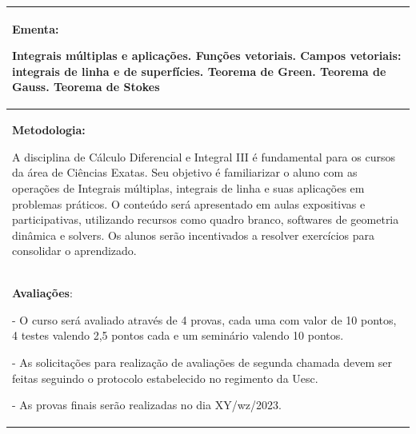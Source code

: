 \documentclass[12pt,a4paper]{article}
\begin{document}
\vspace{1.7cm}\hspace{-1.65cm}
\begin{tabular}{|p{16.8cm}|}
  \hline
  {\bf Ementa:}

  Integrais múltiplas e aplicações. Funções vetoriais. Campos vetoriais: integrais de linha e de superfícies. Teorema de Green. Teorema de Gauss. Teorema de Stokes\\ \hline
  {\bf Metodologia:}

  A disciplina de Cálculo Diferencial e Integral III é fundamental para os cursos da área de Ciências Exatas. Seu objetivo é familiarizar o aluno com as operações de Integrais múltiplas, integrais de linha e suas aplicações em problemas práticos. O conteúdo será apresentado em aulas expositivas e participativas, utilizando recursos como quadro branco, softwares de geometria dinâmica e solvers. Os alunos serão incentivados a resolver exercícios para consolidar o aprendizado.\\ \hline
  {\bf Avaliações}:
  {

  - O curso será avaliado através de 4 provas, cada uma com valor de 10 pontos, 4 testes valendo 2,5 pontos cada e um seminário valendo 10 pontos.

  - As solicitações para realização de avaliações de segunda chamada devem ser feitas seguindo o protocolo estabelecido no regimento da Uesc.

  - As provas finais serão realizadas no dia XY/wz/2023.
  }
  \\ \hline
\end{tabular}

\newpage
\end{document}
